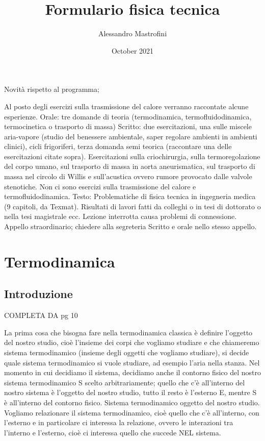 \documentclass[a4paper]{article}
\title{Formulario fisica tecnica}
\author{Alessandro Mastrofini}
\date{October 2021}
\begin{document}
\newpage
\maketitle
\newpage
\tableofcontents
\newpage	

\newpage 

Novità rispetto al programma;

Al posto degli esercizi sulla trasmissione del calore verranno raccontate alcune esperienze.
Orale: tre domande di teoria (termodinamica, termofluidodinamica, termocinetica o trasporto di massa) Scritto: due esercitazioni, una sulle miscele aria-vapore (studio del benessere ambientale, saper regolare ambienti in ambienti clinici), cicli frigoriferi, terza domanda semi teorica (raccontare una delle esercitazioni citate sopra). 
Esercitazioni sulla criochirurgia, sulla termoregolazione del corpo umano, sul trasporto di massa in aorta aneurismatica, sul trasporto di massa nel circolo di Willis e sull’acustica ovvero rumore provocato dalle valvole stenotiche. Non ci sono esercizi sulla trasmissione del calore e termofluidodinamica.
Testo: Problematiche di fisica tecnica in ingegneria medica (9 capitoli, da Texmat). Risultati di lavori fatti da colleghi o in tesi di dottorato o nella tesi magistrale ecc.
Lezione interrotta causa problemi di connessione. Appello straordinario; chiedere alla segreteria Scritto e orale nello stesso appello.

\newpage 


\section{Termodinamica}
	
\subsection{Introduzione}
	
COMPLETA DA pg 10 


La prima cosa che bisogna fare nella termodinamica classica è definire l’oggetto del nostro studio, cioè l’insieme dei corpi che vogliamo studiare e che chiameremo sistema termodinamico (insieme degli oggetti che vogliamo studiare), si decide quale sistema termodinamico si vuole studiare, ad esempio l’aria nella stanza.
Nel momento in cui decidiamo il sistema, decidiamo anche il contorno fisico del nostro sistema termodinamico S scelto arbitrariamente; quello che c’è all’interno del nostro sistema è l’oggetto del nostro studio, tutto il resto è l’esterno E, mentre S è all’interno del contorno fisico.
Sistema termodinamico   oggetto del nostro studio.
Vogliamo relazionare il sistema termodinamico, cioè quello che c’è all’interno, con l’esterno e in particolare ci interessa la relazione, ovvero le interazioni tra l’interno e l’esterno, cioè ci interessa quello che succede NEL sistema.
\end{document}
